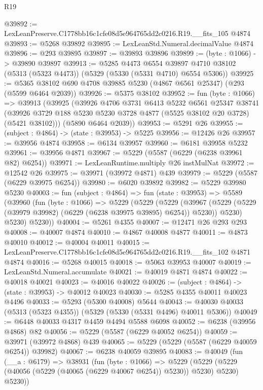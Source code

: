 \begin{lexlean}{R19}
\begin{coremodule}
@39892 := LexLeanPreserve.C1778bb16c1cfe08d5e964765dd2c0216.R19.__fits_105 @4874
@39893 := @5268 @39892
@39895 := LexLeanStd.Numeral.decimalValue @4874
@39896 := @293 @39895
@39897 := @39893 @39896
@39899 := (byte : @1066) -> @39890 @39897
@39913 := @5285
    @4473
    @6554
    @39897
    @4710
    @38102
    (@5313 (@5323 @4473))
    (@5329 (@5330 (@5331 @4710) @6554 @5306))
@39925 := @5365 @38102 @690 @4708 @39885 @5230 (@4867 @6561 @25347) (@293 (@5599 @6464 @2039))
@39926 := @5375 @38102
@39952 := fun (byte : @1066) =>
  @39913
    (@39925
      (@39926
        @4706
        @3731
        @6413
        @5232
        @6561
        @25347
        @38741
        (@39926 @3729 @188 @5230 @5230 @3728 @4877 (@5525 @38102 @20 @3728) (@5421 @38102)))
      (@5890 @6464 @2039))
@39953 := @5291 @26
@39955 := (subject : @4864) -> (state : @39953) -> @5225
@39956 := @12426 @26
@39957 := @39956 @4874
@39958 := @6134 @39957
@39960 := @6181 @39958 @5232
@39961 := @39956 @4871
@39967 := @5229 (@5587 (@6229 (@6238 @39961 @82) @6254))
@39971 := LexLeanRuntime.multiply @26 instMulNat
@39972 := @12542 @26
@39975 := @39971 (@39972 @4871) @439
@39979 := @5229 (@5587 (@6229 @39975 @6254))
@39980 := @6020 @39892
@39982 := @5229 @39980 @5230
@40003 := fun (subject : @4864) =>
  fun (state : @39953) =>
  @5589
    (@39960
      (fun (byte : @1066) =>
      @5229
        (@5229
          (@5229
            (@39967 (@5229 (@5229 (@39979 @39982) (@6229 (@6238 @39975 @39895) @6254)) @5230))
            @5230)
          @5230)
        @5230))
@40004 := @5261 @4355
@40007 := @12471 @26 @293 @293
@40008 := @40007 @4874
@40010 := @4867 @40008 @4877
@40011 := @4873 @40010
@40012 := @40004 @40011
@40015 := LexLeanPreserve.C1778bb16c1cfe08d5e964765dd2c0216.R19.__fits_102 @4871 @4874
@40016 := @5268 @40015
@40018 := @5063 @39953 @40007
@40019 := LexLeanStd.Numeral.accumulate
@40021 := @40019 @4871 @4874
@40022 := @40018 @40021
@40023 := @40016 @40022
@40026 := (subject : @4864) -> (state : @39953) -> @40012 @40023
@40030 := @5285 @4355 @40011 @40023 @4496
@40033 := @5293 (@5300 @40008) @5644
@40043 := @40030 @40033 (@5313 (@5323 @4355)) (@5329 (@5330 (@5331 @4496) @40011 @5306))
@40049 := @6448 @40033 @4317 @4459 @4494 @5588 @6098
@40052 := @6238 (@39956 @4868) @82
@40056 := @5229 (@5587 (@6229 @40052 @6254))
@40059 := @39971 (@39972 @4868) @439
@40065 := @5229 (@5229 (@5587 (@6229 @40059 @6254)) @39982)
@40067 := @6238 @40059 @39895
@40083 := @40049
    (fun (__a : @6179) =>
    @38931
      (fun (byte : @1066) =>
      @5229 (@5229 (@5229 (@40056 (@5229 (@40065 (@6229 @40067 @6254)) @5230)) @5230) @5230) @5230))

\end{coremodule}
\end{lexlean}
